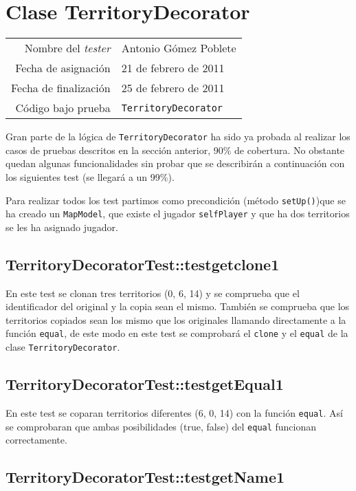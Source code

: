 \section{Clase TerritoryDecorator}

{\small
\begin{tabular}{r|l}
Nombre del \textit{tester} & Antonio Gómez Poblete \\
Fecha de asignación & 21 de febrero de 2011 \\
Fecha de finalización & 25 de febrero de 2011 \\
Código bajo prueba & \texttt{TerritoryDecorator}
\end{tabular}
}

Gran parte de la lógica  de \texttt{TerritoryDecorator} ha sido ya probada al realizar los casos de pruebas descritos en la sección anterior, 90\% de cobertura.
No obstante quedan algunas funcionalidades sin probar que se describirán a continuación con los siguientes test (se llegará a un 99\%). 

Para realizar todos los test partimos como precondición (método \texttt{setUp()})que se ha creado un \texttt{MapModel}, que existe el jugador \texttt{selfPlayer} y que ha  dos territorios se les ha asignado jugador.  

\subsection{TerritoryDecoratorTest::testgetclone1}

En este test se clonan tres territorios (0, 6, 14) y se comprueba que el identificador del original y la copia sean el mismo. También se comprueba que los territorios copiados sean los mismo que los originales llamando directamente a la función \texttt{equal}, de  este modo en este  test se comprobará  el \texttt{clone} y el \texttt{equal} de la clase \texttt{TerritoryDecorator}.


\subsection{TerritoryDecoratorTest::testgetEqual1}

En este test se coparan  territorios diferentes (6, 0, 14) con la función \texttt{equal}. Así se comprobaran que ambas posibilidades (true, false) del \texttt{equal} funcionan correctamente.
 
\subsection{TerritoryDecoratorTest::testgetName1} 

